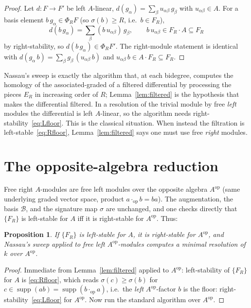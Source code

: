 \documentclass[11pt]{article}
\newtheorem{proposition}[theorem]{Proposition}
\theoremstyle{definition}
\DeclareMathOperator{\supp}{supp}
\DeclareMathOperator{\op}{op}
\newcommand{\Aop}{A^{\op}}
\begin{document}
\begin{proof}
Let $d\colon F\to F'$ be left $A$-linear, $d(g_\alpha)=\sum_\beta
u_{\alpha\beta}\,g_\beta$ with $u_{\alpha\beta}\in A$. For a basis element $b\,
g_\alpha\in\Phi_RF$ (so $\sigma(b)\ge R$, i.e.\ $b\in F_R$),
\[
  d(b\,g_\alpha)=\sum_\beta (b\,u_{\alpha\beta})\,g_\beta,
  \qquad b\,u_{\alpha\beta}\in F_R\cdot A\subseteq F_R
\]
by right-stability, so $d(b\,g_\alpha)\in\Phi_RF'$. The right-module statement is
identical with $d(g_\alpha\,b)=\sum_\beta g_\beta\,(u_{\alpha\beta}\,b)$ and
$u_{\alpha\beta}\,b\in A\cdot F_R\subseteq F_R$.
\end{proof}

Nassau's sweep is exactly the algorithm that, at each bidegree, computes the
homology of the associated-graded of a filtered differential by processing the pieces
$E_R$ in increasing order of $R$; Lemma~\ref{lem:filtered} is the hypothesis that
makes the differential filtered. In a resolution of the trivial module by free
\emph{left} modules the differential is left $A$-linear, so the algorithm needs
right-stability~\eqref{eq:Lfloor}. This is the classical situation. When instead the
filtration is left-stable~\eqref{eq:Rfloor}, Lemma~\ref{lem:filtered} says one must
use free \emph{right} modules.

\section{The opposite-algebra reduction}\label{sec:reduction}

Free right $A$-modules are free left modules over the opposite algebra $\Aop$ (same
underlying graded vector space, product $a\cdot_{\op}b=ba$). The augmentation, the
basis $\mathcal B$, and the signature map $\sigma$ are unchanged, and one checks
directly that $\{F_R\}$ is left-stable for $A$ iff it is right-stable for $\Aop$.
Thus:

\begin{proposition}\label{prop:op-runs}
If $\{F_R\}$ is left-stable for $A$, it is right-stable for $\Aop$, and Nassau's
sweep applied to free left $\Aop$-modules computes a minimal resolution of $k$ over
$\Aop$.
\end{proposition}

\begin{proof}
Immediate from Lemma~\ref{lem:filtered} applied to $\Aop$: left-stability of
$\{F_R\}$ for $A$ is \eqref{eq:Rfloor}, which reads $\sigma(c)\ge\sigma(b)$ for
$c\in\supp(ab)=\supp(b\cdot_{\op}a)$, i.e.\ the \emph{left} $\Aop$-factor $b$ is the
floor: right-stability~\eqref{eq:Lfloor} for $\Aop$. Now run the standard algorithm
over $\Aop$.
\end{proof}
\end{document}
